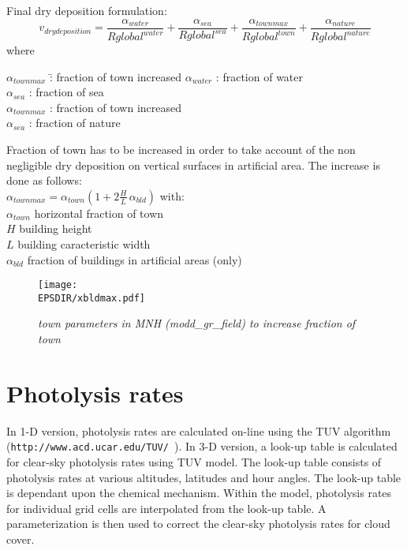 Final dry deposition formulation:
$$
v_{dry deposition} = \frac{\alpha_{water}}{Rglobal^{water}} +
\frac{\alpha_{sea}}{Rglobal^{sea}} +
\frac{\alpha_{townmax}}{Rglobal^{town}} +
\frac{\alpha_{nature}}{Rglobal^{nature}}
$$
where\\ 
\begin{tabbing}
$\alpha_{townmax}$ \=: fraction of town increased \kill
$\alpha_{water}$ \> : fraction of water \\
$\alpha_{sea}$ \> : fraction of sea \\
$\alpha_{townmax}$ \> : fraction of town increased \\
$\alpha_{sea}$ \> : fraction of nature 
\end{tabbing}
Fraction of town has to be increased in order to take account of the non
negligible dry deposition on vertical surfaces in artificial
area. The increase is done as follows:\\
$\alpha_{townmax} = \alpha_{town} (1+2 \frac{H}{L} \, \alpha_{bld})$
with: \\
$\alpha_{town}$ horizontal fraction of town \\
$H$ building height \\
$L$ building caracteristic width \\
$\alpha_{bld}$ fraction of buildings in artificial areas (only)
\begin{figure}[hbp]
\begin{center}
\texttt{[image: \\EPSDIR/xbldmax.pdf]}
\end{center}
\label{bld}
\caption{\sl{town parameters in MNH (modd\_gr\_field) to increase
fraction of town}} 
\end{figure}

%
\section{Photolysis rates}
In 1-D version, photolysis rates are calculated on-line using the TUV algorithm 
\linebreak ({\tt http://www.acd.ucar.edu/TUV/ }). 
In 3-D version, a look-up table is calculated 
for clear-sky photolysis rates using TUV model. The look-up table consists 
of photolysis rates at various altitudes, latitudes and hour angles. 
The look-up table is dependant upon the chemical mechanism. 
Within the model, photolysis rates for individual grid cells are interpolated 
from the look-up table. A parameterization is then used to correct the 
clear-sky photolysis rates for cloud cover. 

